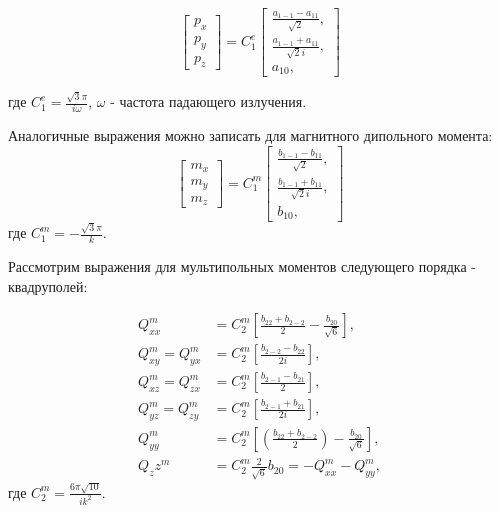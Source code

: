 \begin{equation}
    \begin{bmatrix}
        p_x \\
        p_y \\
        p_z
    \end{bmatrix} = C^e_1 \begin{bmatrix}
        \frac{a_{1-1} - a_{11}}{\sqrt{2}},\\
        \frac{a_{1-1}+a_{11}}{\sqrt{2}i},\\
        a_{10},
    \end{bmatrix}
\end{equation}

где $C_1^e = \frac{\sqrt{3} \pi}{i \omega}$, $\omega$ - частота падающего излучения.

Аналогичные выражения можно записать для магнитного дипольного момента:
\begin{equation}
    \begin{bmatrix}
        m_x \\
        m_y \\
        m_z
    \end{bmatrix} = C_1^m \begin{bmatrix}
        \frac{b_{1-1} - b_{11}}{\sqrt{2}},\\
        \frac{b_{1-1}+b_{11}}{\sqrt{2}i},\\
        b_{10},
    \end{bmatrix}
\end{equation}
где $C_1^m = -\frac{\sqrt{3} \pi}{k}$.

Рассмотрим выражения для мультипольных моментов следующего порядка - квадруполей:

\begin{align*}
    Q_{xx}^m &= C^m_2 \left[ \frac{b_{22}+b_{2-2}}{2} - \frac{b_{20}}{\sqrt{6}} \right], \\
    Q_{xy}^m = Q_{yx}^m &= C^m_2 \left[ \frac{b_{2-2}-b_{22}}{2 i} \right], \\
    Q_{xz}^m = Q_{zx}^m &= C^m_2 \left[ \frac{b_{2-1}-b_{21}}{2}  \right],\\
    Q_{yz}^m = Q_{zy}^m &= C^m_2 \left[ \frac{b_{2-1}+b_{21}}{2i} \right],\\
    Q_{yy}^m &= C^m_2 \left[ \left( \frac{b_{22}+b_{2-2}}{2} \right)  -\frac{b_{20}}{\sqrt{6}}\right],\\
    Q_zz^m &= C^m_2 \frac{2 }{\sqrt{6}} b_{20} = -Q_{xx}^m -Q_{yy}^m,
\end{align*}
где $C_2^m = \frac{6 \pi \sqrt{10}}{i k^2}$. 

